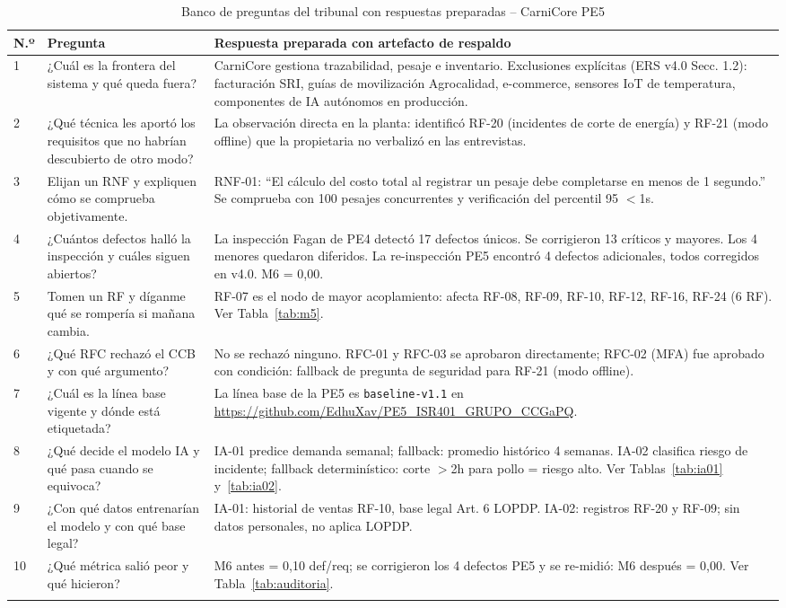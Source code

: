 \documentclass[11pt,a4paper]{article}
\begin{document}
\begin{longtable}{|p{0.5cm}|p{5cm}|p{8.5cm}|}
\hline
\textbf{N.º} & \textbf{Pregunta} & \textbf{Respuesta preparada con artefacto de respaldo} \\
\hline
1 & ¿Cuál es la frontera del sistema y qué queda fuera? & CarniCore gestiona trazabilidad, pesaje e inventario. Exclusiones explícitas (ERS v4.0 Secc. 1.2): facturación SRI, guías de movilización Agrocalidad, e-commerce, sensores IoT de temperatura, componentes de IA autónomos en producción. \\
\hline
2 & ¿Qué técnica les aportó los requisitos que no habrían descubierto de otro modo? & La observación directa en la planta: identificó RF-20 (incidentes de corte de energía) y RF-21 (modo offline) que la propietaria no verbalizó en las entrevistas. \\
\hline
3 & Elijan un RNF y expliquen cómo se comprueba objetivamente. & RNF-01: ``El cálculo del costo total al registrar un pesaje debe completarse en menos de 1 segundo.'' Se comprueba con 100 pesajes concurrentes y verificación del percentil 95 $<$1s. \\
\hline
4 & ¿Cuántos defectos halló la inspección y cuáles siguen abiertos? & La inspección Fagan de PE4 detectó 17 defectos únicos. Se corrigieron 13 críticos y mayores. Los 4 menores quedaron diferidos. La re-inspección PE5 encontró 4 defectos adicionales, todos corregidos en v4.0. M6 = 0,00. \\
\hline
5 & Tomen un RF y díganme qué se rompería si mañana cambia. & RF-07 es el nodo de mayor acoplamiento: afecta RF-08, RF-09, RF-10, RF-12, RF-16, RF-24 (6 RF). Ver Tabla~\ref{tab:m5}. \\
\hline
6 & ¿Qué RFC rechazó el CCB y con qué argumento? & No se rechazó ninguno. RFC-01 y RFC-03 se aprobaron directamente; RFC-02 (MFA) fue aprobado con condición: fallback de pregunta de seguridad para RF-21 (modo offline). \\
\hline
7 & ¿Cuál es la línea base vigente y dónde está etiquetada? & La línea base de la PE5 es \texttt{baseline-v1.1} en \url{https://github.com/EdhuXav/PE5_ISR401_GRUPO_CCGaPQ}. \\
\hline
8 & ¿Qué decide el modelo IA y qué pasa cuando se equivoca? & IA-01 predice demanda semanal; fallback: promedio histórico 4 semanas. IA-02 clasifica riesgo de incidente; fallback determinístico: corte $>$2h para pollo = riesgo alto. Ver Tablas~\ref{tab:ia01} y~\ref{tab:ia02}. \\
\hline
9 & ¿Con qué datos entrenarían el modelo y con qué base legal? & IA-01: historial de ventas RF-10, base legal Art. 6 LOPDP. IA-02: registros RF-20 y RF-09; sin datos personales, no aplica LOPDP. \\
\hline
10 & ¿Qué métrica salió peor y qué hicieron? & M6 antes = 0,10 def/req; se corrigieron los 4 defectos PE5 y se re-midió: M6 después = 0,00. Ver Tabla~\ref{tab:auditoria}. \\
\hline
\caption{Banco de preguntas del tribunal con respuestas preparadas -- CarniCore PE5}
\end{longtable}
\end{document}
